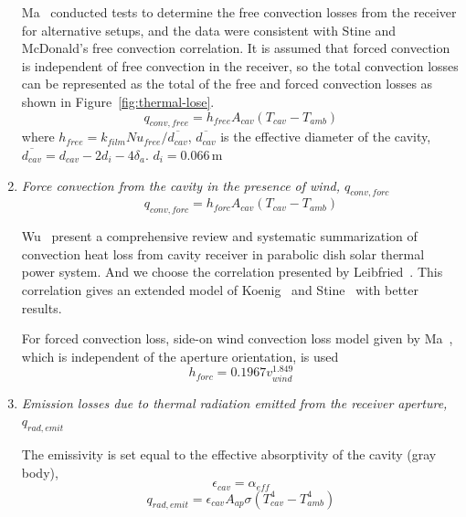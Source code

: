 \begin{enumerate}
  Ma~\cite{Ma1993} conducted tests to determine the free convection losses from the receiver for alternative setups, and the data were consistent with Stine and McDonald's free convection correlation. It is assumed that forced convection is independent of free convection in the receiver, so the total convection losses can be represented as the total of the free and forced convection losses as shown in Figure~\ref{fig:thermal-lose}.  
  \begin{equation}
	q_{conv,free} = h_{free}A_{cav}(T_{cav}-T_{amb})
\end{equation}
where $h_{free}=k_{film}Nu_{free}/\overline{d_{cav}}$, $\overline{d_{cav}}$ is the effective diameter of the cavity, $\overline{d_{cav}}=d_{cav}-2d_i-4 \delta_a$.
$d_{i}=0.066\,$m
  
  \item \emph{Force convection from the cavity in the presence of wind, $q_{conv,forc}$}  
  \begin{equation}
	q_{conv,forc} = h_{forc}A_{cav}(T_{cav}-T_{amb})
\end{equation}

    Wu~\cite{Wu2010} present a comprehensive review and systematic summarization of convection heat loss from cavity receiver in parabolic dish solar thermal power system. And we choose the correlation presented by Leibfried~\cite{Leibfried1995}. This correlation gives an extended model of Koenig~\cite{Koenig1981} and Stine~\cite{Stine1994} with better results.

For forced convection loss, side-on wind convection loss model given by Ma~\cite{Ma1993}, which is independent of the aperture orientation, is used
\begin{equation}
	h_{forc}=0.1967v_{wind}^{1.849}
\end{equation}

  \item \emph{Emission losses due to thermal radiation emitted from the receiver aperture, $q_{rad,emit}$}
  
  The emissivity is set equal to the effective absorptivity of the cavity (gray body),
\begin{equation}
    \epsilon_{cav}=\alpha_{eff}
\end{equation}
\begin{equation}
    q_{rad,emit}=\epsilon_{cav}A_{ap}\sigma(T_{cav}^{4}-T_{amb}^{4})
\end{equation}
\end{enumerate}

